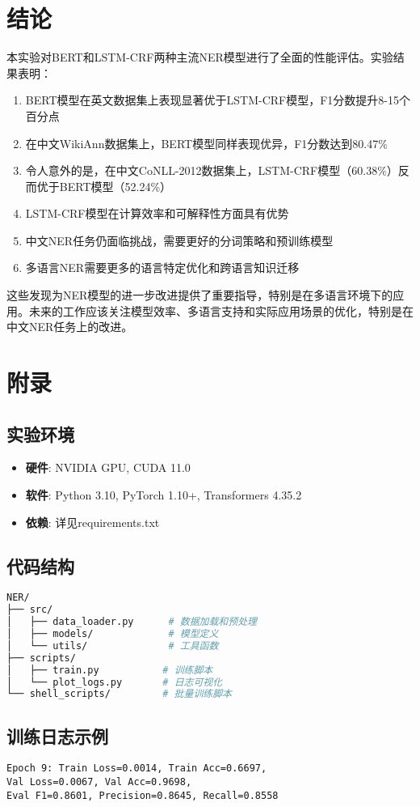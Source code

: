 \documentclass{article}
\begin{document}
\section{结论}

本实验对BERT和LSTM-CRF两种主流NER模型进行了全面的性能评估。实验结果表明：

\begin{enumerate}
    \item BERT模型在英文数据集上表现显著优于LSTM-CRF模型，F1分数提升8-15个百分点
    \item 在中文WikiAnn数据集上，BERT模型同样表现优异，F1分数达到80.47\%
    \item 令人意外的是，在中文CoNLL-2012数据集上，LSTM-CRF模型（60.38\%）反而优于BERT模型（52.24\%）
    \item LSTM-CRF模型在计算效率和可解释性方面具有优势
    \item 中文NER任务仍面临挑战，需要更好的分词策略和预训练模型
    \item 多语言NER需要更多的语言特定优化和跨语言知识迁移
\end{enumerate}

这些发现为NER模型的进一步改进提供了重要指导，特别是在多语言环境下的应用。未来的工作应该关注模型效率、多语言支持和实际应用场景的优化，特别是在中文NER任务上的改进。

\section{附录}

\subsection{实验环境}
\begin{itemize}
    \item \textbf{硬件}: NVIDIA GPU, CUDA 11.0
    \item \textbf{软件}: Python 3.10, PyTorch 1.10+, Transformers 4.35.2
    \item \textbf{依赖}: 详见requirements.txt
\end{itemize}

\subsection{代码结构}
\begin{lstlisting}[language=bash]
NER/
├── src/
│   ├── data_loader.py      # 数据加载和预处理
│   ├── models/             # 模型定义
│   └── utils/              # 工具函数
├── scripts/
│   ├── train.py           # 训练脚本
│   └── plot_logs.py       # 日志可视化
└── shell_scripts/         # 批量训练脚本
\end{lstlisting}

\subsection{训练日志示例}
\begin{lstlisting}[language=text]
Epoch 9: Train Loss=0.0014, Train Acc=0.6697, 
Val Loss=0.0067, Val Acc=0.9698, 
Eval F1=0.8601, Precision=0.8645, Recall=0.8558
\end{lstlisting}
\end{document}
